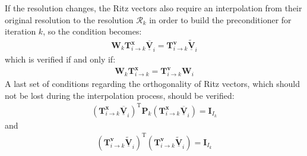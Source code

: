 \documentclass[12pt]{scrartcl}
\begin{document}
If the resolution changes, the Ritz vectors also require an interpolation from their original resolution to the resolution $\mathcal{R}_k$ in order to build the preconditioner for iteration $k$, so the condition becomes: 
\begin{align}
\mathbf{W}_k \mathbf{T}^\mathbf{x}_{i \rightarrow k} \underline{\overline{\mathbf{V}}}_i = \mathbf{T}^\mathbf{v}_{i \rightarrow k} \underline{\widetilde{\mathbf{V}}}_i
\end{align}
which is verified if and only if:
\begin{align}
\label{eq:eq_cond_3}
\mathbf{W}_k \mathbf{T}^\mathbf{x}_{i \rightarrow k} = \mathbf{T}^\mathbf{v}_{i \rightarrow k} \mathbf{W}_i
\end{align}
A last set of conditions regarding the orthogonality of Ritz vectors, which should not be lost during the interpolation process, should be verified:
\begin{align}
\label{eq:eq_cond_4}
\left(\mathbf{T}^\mathbf{x}_{i \rightarrow k} \underline{\overline{\mathbf{V}}}_i\right)^\mathrm{T} \mathbf{P}_k\left(\mathbf{T}^\mathbf{x}_{i \rightarrow k} \underline{\overline{\mathbf{V}}}_i\right) = \mathbf{I}_{I_k}
\end{align}
and
\begin{align}
\label{eq:eq_cond_5}
\left(\mathbf{T}^\mathbf{v}_{i \rightarrow k} \underline{\widetilde{\mathbf{V}}}_i\right)^\mathrm{T} \left(\mathbf{T}^\mathbf{v}_{i \rightarrow k} \underline{\widetilde{\mathbf{V}}}_i\right) = \mathbf{I}_{I_k}
\end{align}
\end{document}
